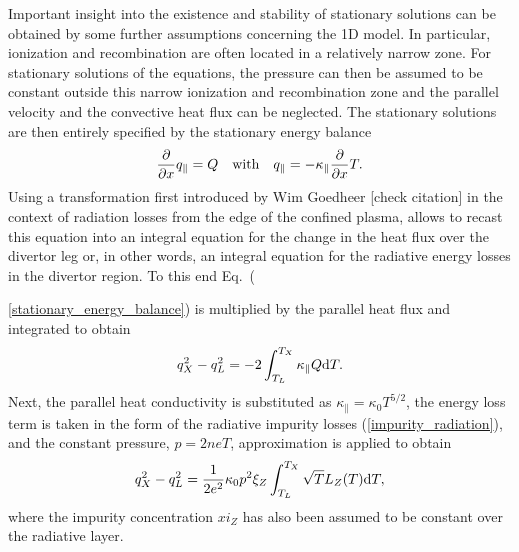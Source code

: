 \documentclass[amsmath,amssymb,a4]{revtex4}
\begin{document}
Important insight into the existence and stability of stationary solutions can be obtained by some further assumptions concerning the 1D model. In particular, ionization and recombination are often located in a relatively narrow zone. For stationary solutions of the equations, the pressure can then be assumed to be constant outside this narrow ionization and recombination zone and the parallel velocity and the convective heat flux can be neglected. The stationary solutions are then entirely specified by the stationary energy balance
\begin{equation}\label{stationary_energy_balance}
    {\partial \over \partial x} q_\parallel = Q \quad\hbox{with}\quad q_\parallel = - \kappa_\parallel {\partial \over \partial x} T.
\end{equation}
Using a transformation first introduced by Wim Goedheer [check citation] in the context of radiation losses from the edge of the confined plasma, allows to recast this equation into an integral equation for the change in the heat flux over the divertor leg or, in other words, an integral equation for the radiative energy losses in the divertor region. To this end Eq.~({\ref{stationary_energy_balance}) is multiplied by the parallel heat flux and integrated to obtain
\begin{equation}\label{flux_change}
    q_X^2 - q_L^2 = - 2 \int_{T_L}^{T_X} \kappa_\parallel Q {\rm d}T.
\end{equation}
Next, the parallel heat conductivity is substituted as $\kappa_\parallel = \kappa_0 T^{5/2}$, the energy loss term is taken in the form of the radiative impurity losses (\ref{impurity_radiation}), and the constant pressure, $ p = 2 neT$, approximation is applied to obtain~\cite{lengyel1981,capes1992,hutchinson1994}
\begin{equation}\label{flux_change_2}
    q_X^2 - q_L^2 = {1\over2 e^2} \kappa_0 p^2 \xi_Z \int_{T_L}^{T_X} \sqrt{T} L_Z(T) {\rm d}T,
\end{equation}
where the impurity concentration $xi_Z$ has also been assumed to be constant over the radiative layer.

}
\end{document}
